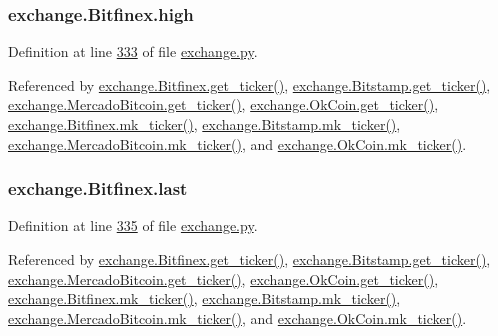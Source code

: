 \subsubsection[{\texorpdfstring{high}{high}}]{\setlength{\rightskip}{0pt plus 5cm}exchange.\+Bitfinex.\+high}\hypertarget{classexchange_1_1_bitfinex_a1380a7a7a3438e47785f10f68b0d61b9}{}\label{classexchange_1_1_bitfinex_a1380a7a7a3438e47785f10f68b0d61b9}


Definition at line \hyperlink{exchange_8py_source_l00333}{333} of file \hyperlink{exchange_8py_source}{exchange.\+py}.



Referenced by \hyperlink{exchange_8py_source_l00340}{exchange.\+Bitfinex.\+get\+\_\+ticker()}, \hyperlink{exchange_8py_source_l00409}{exchange.\+Bitstamp.\+get\+\_\+ticker()}, \hyperlink{exchange_8py_source_l00543}{exchange.\+Mercado\+Bitcoin.\+get\+\_\+ticker()}, \hyperlink{exchange_8py_source_l00608}{exchange.\+Ok\+Coin.\+get\+\_\+ticker()}, \hyperlink{exchange_8py_source_l00354}{exchange.\+Bitfinex.\+mk\+\_\+ticker()}, \hyperlink{exchange_8py_source_l00423}{exchange.\+Bitstamp.\+mk\+\_\+ticker()}, \hyperlink{exchange_8py_source_l00557}{exchange.\+Mercado\+Bitcoin.\+mk\+\_\+ticker()}, and \hyperlink{exchange_8py_source_l00622}{exchange.\+Ok\+Coin.\+mk\+\_\+ticker()}.

\subsubsection[{\texorpdfstring{last}{last}}]{\setlength{\rightskip}{0pt plus 5cm}exchange.\+Bitfinex.\+last}\hypertarget{classexchange_1_1_bitfinex_a56e491a27f4b3215b66e13da7796c078}{}\label{classexchange_1_1_bitfinex_a56e491a27f4b3215b66e13da7796c078}


Definition at line \hyperlink{exchange_8py_source_l00335}{335} of file \hyperlink{exchange_8py_source}{exchange.\+py}.



Referenced by \hyperlink{exchange_8py_source_l00340}{exchange.\+Bitfinex.\+get\+\_\+ticker()}, \hyperlink{exchange_8py_source_l00409}{exchange.\+Bitstamp.\+get\+\_\+ticker()}, \hyperlink{exchange_8py_source_l00543}{exchange.\+Mercado\+Bitcoin.\+get\+\_\+ticker()}, \hyperlink{exchange_8py_source_l00608}{exchange.\+Ok\+Coin.\+get\+\_\+ticker()}, \hyperlink{exchange_8py_source_l00354}{exchange.\+Bitfinex.\+mk\+\_\+ticker()}, \hyperlink{exchange_8py_source_l00423}{exchange.\+Bitstamp.\+mk\+\_\+ticker()}, \hyperlink{exchange_8py_source_l00557}{exchange.\+Mercado\+Bitcoin.\+mk\+\_\+ticker()}, and \hyperlink{exchange_8py_source_l00622}{exchange.\+Ok\+Coin.\+mk\+\_\+ticker()}.


